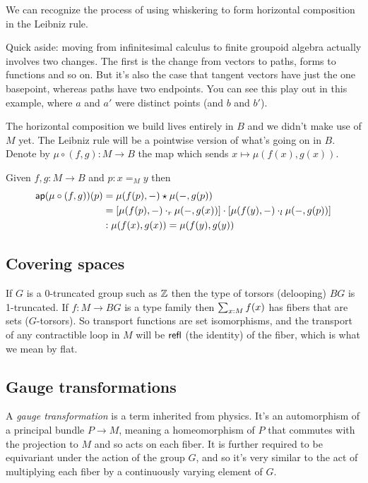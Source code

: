 \documentclass[12pt]{article}
\begin{document}
We can recognize the process of using whiskering to form horizontal composition in the Leibniz rule. 

Quick aside: moving from infinitesimal calculus to finite groupoid algebra actually involves two changes. The first is the change from vectors to paths, forms to functions and so on. But it's also the case that tangent vectors have just the one basepoint, whereas paths have two endpoints. You can see this play out in this example, where \( a \) and \( a' \) were distinct points (and \( b \) and \( b' \)).

The horizontal composition we build lives entirely in \( B \) and we didn't make use of \( M \) yet. The Leibniz rule will be a pointwise version of what's going on in \( B \). Denote by \( \mu\circ(f,g):M\to B \) the map which sends \( x\mapsto \mu(f(x),g(x)) \).

\begin{mylemma}
Given \( f, g:M\to B \) and \( p:x=_M y \) then 
\begin{align*}
 \mathsf{ap}(\mu\circ(f,g))(p)&=\mu(f(p),-)\star\mu(-,g(p))\\
 &=\left[\mu(f(p),-)\cdot_r \mu(-,g(x))\right]\cdot \left[\mu(f(y),-)\cdot_l\mu(-,g(p))\right]\\
 &:\mu(f(x),g(x))=\mu(f(y),g(y))
\end{align*}
\end{mylemma}

\subsection{Covering spaces}

If \( G \) is a 0-truncated group such as \( \mathbb{Z} \) then the type of torsors (delooping) \( BG \) is 1-truncated. If \( f:M\to BG \) is a type family then \( \sum_{x:M}f(x) \) has fibers that are sets (\( G \)-torsors). So transport functions are set isomorphisms, and the transport of any contractible loop in \( M \) will be \( \mathsf{refl} \) (the identity) of the fiber, which is what we mean by flat.

\subsection{Gauge transformations}

A \emph{gauge transformation} is a term inherited from physics. It's an automorphism of a principal bundle \( P\to M \), meaning a homeomorphism of \( P \) that commutes with the projection to \( M \) and so acts on each fiber. It is further required to be equivariant under the action of the group \( G \), and so it's very similar to the act of multiplying each fiber by a continuously varying element of \( G \).
\end{document}
